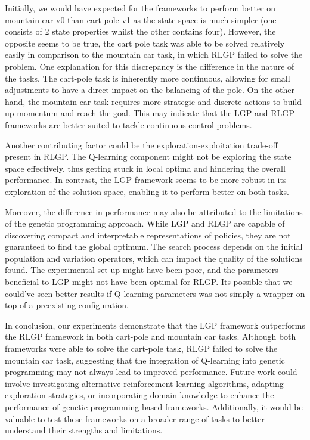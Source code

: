 \documentclass[12pt, final]{dalcsthesis}
\begin{document}
Initially, we would have expected for the frameworks to perform better on mountain-car-v0 than cart-pole-v1 as the state space is much simpler (one consists of 2 state properties whilst the other contains four). However, the opposite seems to be true,
the cart pole task was able to be solved relatively easily in comparison to the mountain car task, in which RLGP failed to solve the problem. One explanation for this discrepancy is the difference in the nature of the tasks. The cart-pole task is inherently more continuous, allowing for small adjustments to have a direct impact on the balancing of the pole. On the other hand, the mountain car task requires more strategic and discrete actions to build up momentum and reach the goal. This may indicate that the LGP and RLGP frameworks are better suited to tackle continuous control problems.

Another contributing factor could be the exploration-exploitation trade-off present in RLGP. The Q-learning component might not be exploring the state space effectively, thus getting stuck in local optima and hindering the overall performance. In contrast, the LGP framework seems to be more robust in its exploration of the solution space, enabling it to perform better on both tasks.

Moreover, the difference in performance may also be attributed to the limitations of the genetic programming approach. While LGP and RLGP are capable of discovering compact and interpretable representations of policies, they are not guaranteed to find the global optimum. The search process depends on the initial population and variation operators, which can impact the quality of the solutions found. The experimental set up might have been poor, and the parameters beneficial to LGP might not have been optimal for RLGP. Its possible that
we could've seen better results if Q learning parameters was not simply a wrapper on top of a preexisting configuration.

In conclusion, our experiments demonstrate that the LGP framework outperforms the RLGP framework in both cart-pole and mountain car tasks. Although both frameworks were able to solve the cart-pole task, RLGP failed to solve the mountain car task, suggesting that the integration of Q-learning into genetic programming may not always lead to improved performance. Future work could involve investigating alternative reinforcement learning algorithms, adapting exploration strategies, or incorporating domain knowledge to enhance the performance of genetic programming-based frameworks. Additionally, it would be valuable to test these frameworks on a broader range of tasks to better understand their strengths and limitations.
\end{document}
